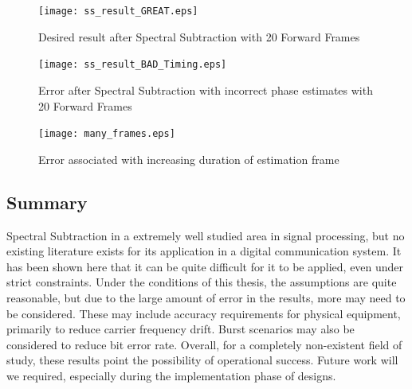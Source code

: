 \begin{figure}\label{ss_result_great}
\centering
\texttt{[image: ss\_result\_GREAT.eps]}
\caption{Desired result after Spectral Subtraction with 20 Forward Frames}
\end{figure}

\begin{figure}\label{ss_result_bad}
\centering
\texttt{[image: ss\_result\_BAD\_Timing.eps]}
\caption{Error after Spectral Subtraction with incorrect phase estimates with 20 Forward Frames}
\end{figure}

\begin{figure}\label{many_frames}
\centering
\texttt{[image: many\_frames.eps]}
\caption{Error associated with increasing duration of estimation frame}
\end{figure}




\subsection{Summary}

Spectral Subtraction in a extremely well studied area in signal processing, but no existing literature exists for its application in a digital communication system.  It has been shown here that it can be quite difficult for it to be applied, even under strict constraints.  Under the conditions of this thesis, the assumptions are quite reasonable, but due to the large amount of error in the results, more may need to be considered.  These may include accuracy requirements for physical equipment, primarily to reduce carrier frequency drift.  Burst scenarios may also be considered to reduce bit error rate.  Overall, for a completely non-existent field of study, these results point the possibility of operational success.  Future work will we required, especially during the implementation phase of designs.\\

